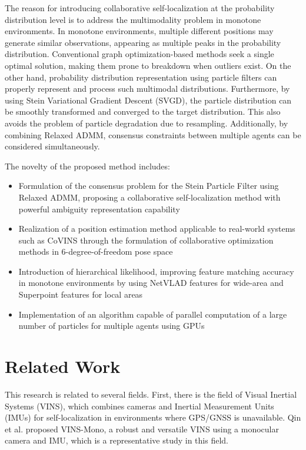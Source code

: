 \documentclass[a4paper,fleqn,10pt,twocolumn]{SICE_ISCS}
\begin{document}
The reason for introducing collaborative self-localization at the probability distribution level is to address the multimodality problem in monotone environments. In monotone environments, multiple different positions may generate similar observations, appearing as multiple peaks in the probability distribution. Conventional graph optimization-based methods seek a single optimal solution, making them prone to breakdown when outliers exist. On the other hand, probability distribution representation using particle filters can properly represent and process such multimodal distributions. Furthermore, by using Stein Variational Gradient Descent (SVGD), the particle distribution can be smoothly transformed and converged to the target distribution. This also avoids the problem of particle degradation due to resampling. Additionally, by combining Relaxed ADMM, consensus constraints between multiple agents can be considered simultaneously.

The novelty of the proposed method includes:
\begin{itemize}
\item Formulation of the consensus problem for the Stein Particle Filter using Relaxed ADMM, proposing a collaborative self-localization method with powerful ambiguity representation capability
\item Realization of a position estimation method applicable to real-world systems such as CoVINS through the formulation of collaborative optimization methods in 6-degree-of-freedom pose space
\item Introduction of hierarchical likelihood, improving feature matching accuracy in monotone environments by using NetVLAD features for wide-area and Superpoint features for local areas
\item Implementation of an algorithm capable of parallel computation of a large number of particles for multiple agents using GPUs
\end{itemize}

\section{Related Work}
This research is related to several fields. First, there is the field of Visual Inertial Systems (VINS), which combines cameras and Inertial Measurement Units (IMUs) for self-localization in environments where GPS/GNSS is unavailable. Qin et al. \cite{Qin2018} proposed VINS-Mono, a robust and versatile VINS using a monocular camera and IMU, which is a representative study in this field.
\end{document}
